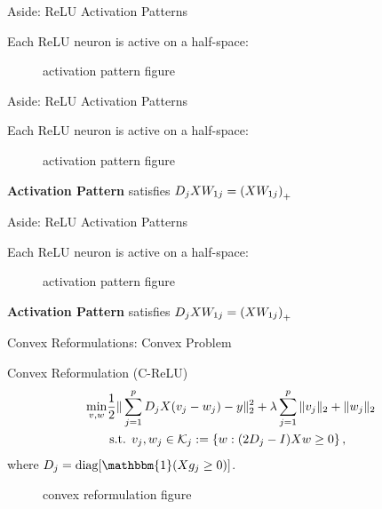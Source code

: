 \documentclass[usenames,dvipsnames,mathserif,notheorems]{beamer}
\newcommand{\good}[1]{\textcolor{good}{#1}}
\def\showtikz{}
\begin{document}
\begin{frame}{Aside: ReLU Activation Patterns}

	Each ReLU neuron is active on a half-space:

	\pause

	\begin{figure}[]
		\centering
		\ifdefined\showtikz
			
		\else
			\Huge activation pattern figure
		\fi
	\end{figure}


\end{frame}

\begin{frame}{Aside: ReLU Activation Patterns}

	Each ReLU neuron is active on a half-space:

	\begin{figure}[]
		\centering
		\ifdefined\showtikz
			
		\else
			\Huge activation pattern figure
		\fi
	\end{figure}

	\pause
	\textbf{Activation Pattern} satisfies \( D_j X W_{1j} = \left(X W_{1j}\right)_+ \)

\end{frame}

\begin{frame}{Aside: ReLU Activation Patterns}

	Each ReLU neuron is active on a half-space:

	\begin{figure}[]
		\centering
		\ifdefined\showtikz
			
		\else
			\Huge activation pattern figure
		\fi
	\end{figure}


	\textbf{Activation Pattern} satisfies \( D_j X W_{1j} = \left(X W_{1j}\right)_+ \)

\end{frame}


\begin{frame}{Convex Reformulations: Convex Problem}

	{\large \good{Convex Reformulation} (C-ReLU)} \citep{pilanci2020convex}
	\[
		\begin{aligned}
			\min_{v, w} & \frac 1 2 \|\sum_{j=1}^p D_j X (v_j - w_j) - y\|_2^2 +
			\lambda \sum_{j=1}^p \|v_j\|_2 + \|w_j\|_2                    \\
			            & \hspace{0.2em} \text{s.t. }
			v_j, w_j \in \mathcal{K}_j := \left\{w : (2D_j - I) X w \geq 0\right\},
		\end{aligned}
	\]
	where \( D_j = \text{diag}[\mathbbm{1}(X g_j \geq 0)] \).
	\pause

	\begin{figure}[]
		\centering
		\ifdefined\showtikz
			
		\else
			\Huge convex reformulation figure
		\fi
	\end{figure}
\end{frame}
\end{document}
